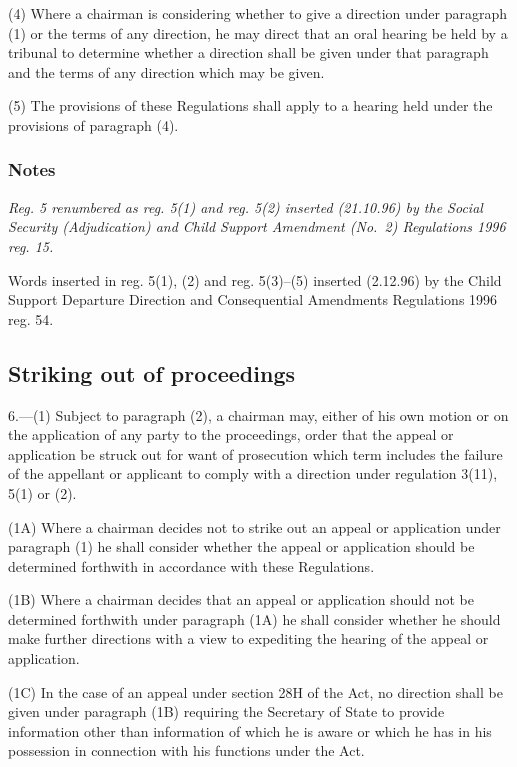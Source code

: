 \documentclass[a4paper]{article}
\newcommand\amendment[1]{\subsubsection*{Notes}{\itshape\frenchspacing\footnotesize #1 \par}}
\begin{document}
(4) Where a chairman is considering whether to give a direction under paragraph (1) or the terms of any direction, he may direct that an oral hearing be held by a tribunal to determine whether a direction shall be given under that paragraph and the terms of any direction which may be given.

(5) The provisions of these Regulations shall apply to a hearing held under the provisions of paragraph (4).

\amendment{
Reg. 5 renumbered as reg. 5(1) and reg. 5(2) inserted (21.10.96) by the Social Security (Adjudication) and Child Support Amendment (No.\ 2) Regulations 1996 reg. 15.

Words inserted in reg. 5(1), (2) and reg. 5(3)--(5) inserted (2.12.96) by the Child Support Departure Direction and Consequential Amendments Regulations 1996 reg. 54.
}

\subsection[6. Striking out of proceedings]{Striking out of proceedings}

6.—(1) Subject to paragraph (2), a chairman may, either of his own motion or on the application of any party to the proceedings, order that the appeal or application be struck out 
for want of prosecution which term includes  %
the failure of the appellant or applicant to comply with 
a direction under regulation 3(11), 5(1) or (2).  %

(1A) Where a chairman decides not to strike out an appeal or application under paragraph (1) he shall consider whether the appeal or application should be determined forthwith in accordance with these Regulations.

(1B) Where a chairman decides that an appeal or application should not be determined forthwith under paragraph (1A) he shall consider whether he should make further directions with a view to expediting the hearing of the appeal or application.

(1C) In the case of an appeal under section 28H of the Act, no direction shall
be given under paragraph (1B) requiring the Secretary of State to provide
information other than information of which he is aware or which he has in his
possession in connection with his functions under the Act.
\end{document}
